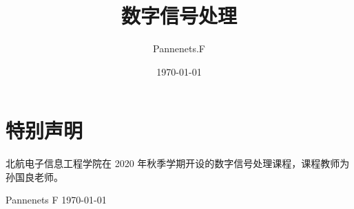 \documentclass[cn,11pt,chinese,black,simple]{elegantbook}
\title{数字信号处理}
\author{Pannenets.F}
\date{\today}
\begin{document}
\maketitle
\frontmatter

\chapter*{特别声明}

北航电子信息工程学院在 2020 年秋季学期开设的数字信号处理课程，课程教师为孙国良老师。

% 

\begin{flushright}
Pannenets F
\today
\end{flushright}

\tableofcontents

\mainmatter





\end{document}
